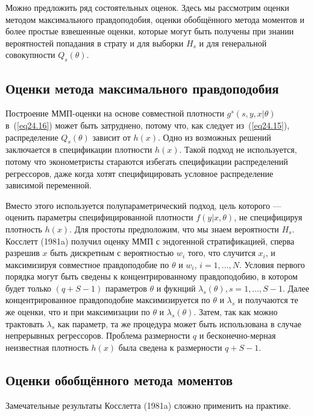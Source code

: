 Можно предложить ряд состоятельных оценок. Здесь мы рассмотрим оценки методом максимального правдоподобия, оценки обобщённого метода моментов и более простые взвешенные оценки, которые могут быть получены при знании вероятностей попадания в страту и для выборки $H_s$ и для генеральной совокупности $Q_s(\theta)$. 

\subsection*{Оценки метода максимального правдоподобия}

Построение ММП-оценки на основе совместной плотности $g^s(s,y,x|\theta)$ в~(\ref{eq24.16}) может быть затруднено, потому что, как следует из~(\ref{eq24.15}), распределение $Q_s(\theta)$ зависит от $h(x)$. Одно из возможных решений заключается в спецификации плотности $h(x)$. Такой подход не используется, потому что эконометристы стараются избегать спецификации распределений регрессоров, даже когда хотят специфицировать условное распределение зависимой переменной. 

Вместо этого используется полупараметрический подход, цель которого --- оценить параметры специфицированной плотности $f(y|x, \theta)$, не специфицируя плотность $h(x)$. Для простоты предположим, что мы знаем вероятности $H_s$. Косслетт (1981a) получил оценку ММП с эндогенной стратификацией, сперва разрешив $x$ быть дискретным с вероятностью $w_i$ того, что случится $x_i$, и максимизируя совместное правдоподобие по $\theta$ и $w_i$, $i = 1, \dots , N$. Условия первого порядка могут быть сведены к концентрированному правдоподобию, в котором будет только $(q+S-1)$ параметров $\theta$ и фукнций $\lambda_s(\theta), s = 1, \dots, S-1$. Далее концентрированное правдоподобие максимизируется по $\theta$ и $\lambda_s$ и получаются те же оценки, что и при максимизации по $\theta$ и $\lambda_s(\theta)$. Затем, так как можно трактовать $\lambda_s$ как параметр, та же процедура может быть использована в случае непрерывных регрессоров. Проблема размерности $q$ и бесконечно-мерная неизвестная плотность $h(x)$ была сведена к размерности $q+S-1$. 

\subsection*{Оценки обобщённого метода моментов}

Замечательные результаты Косслетта (1981a) сложно применить на практике. 

